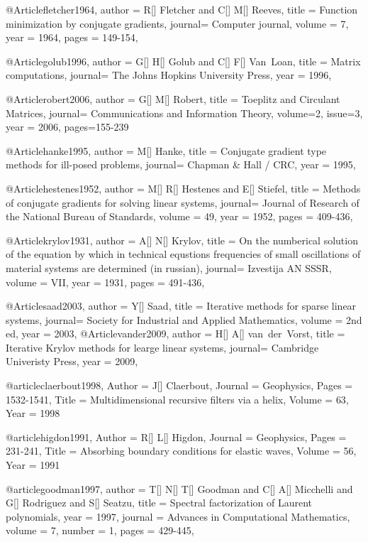{@Article{fletcher1964,
  author = 	 {R[] Fletcher and C[] M[] Reeves},
  title  = 	 {Function minimization by conjugate gradients},
  journal= 	 {Computer journal},
  volume =	 {7},
  year   = 	 1964,
  pages = 149-154,
}

@Article{golub1996,
  author = 	 {G[] H[] Golub and C[] F[] Van~Loan},
  title  = 	 {Matrix computations},
  journal= 	 {The Johns Hopkins University Press},
  year   = 	 1996,
}

@Article{robert2006,
  author = 	 {G[] M[] Robert},
  title  = 	 {Toeplitz and Circulant Matrices},
  journal= 	 {Communications and Information Theory},
  volume=2,
  issue=3,
  year   = 	 2006,
  pages={155-239}
}

@Article{hanke1995,
  author = 	 {M[] Hanke},
  title  = 	 {Conjugate gradient type methods for ill-posed problems},
  journal= 	 {Chapman \& Hall / CRC},
  year   = 	 1995,
}

@Article{hestenes1952,
  author = 	 {M[] R[] Hestenes and E[] Stiefel},
  title  = 	 {Methods of conjugate gradients for solving linear systems},
  journal= 	 {Journal of Research of the National Bureau of Standards},
  volume =	 {49},
  year   = 	 1952,
  pages = 	 409-436,
}

@Article{krylov1931,
  author = 	 {A[] N[] Krylov},
  title  = 	 {On the numberical solution of the equation by which in technical equstions frequencies of small oscillations of material systems are determined (in russian)},
  journal= 	 {Izvestija AN SSSR},
  volume =	 {VII},
  year   = 	 1931,
  pages = 491-436,
}

@Article{saad2003,
  author = 	 {Y[] Saad},
  title  = 	 {Iterative methods for sparse linear systems},
  journal= 	 {Society for Industrial and Applied Mathematics},
  volume =	 {2nd ed},
  year   = 	 2003,
}
@Article{vander2009,
  author = 	 {H[] A[] van~der~Vorst},
  title  = 	 {Iterative Krylov methods for learge linear systems},
  journal= 	 {Cambridge Univeristy Press},
  year   = 	 2009,
}


@article{claerbout1998,
	Author = {J[] Claerbout},
	Journal = {Geophysics},
	Pages = {1532-1541},
	Title = {Multidimensional recursive filters via a helix},
	Volume = {63},
	Year = {1998}}

@article{higdon1991,
	Author = {R[] L[] Higdon},
	Journal = {Geophysics},
	Pages = {231-241},
	Title = {Absorbing boundary conditions for elastic waves},
	Volume = {56},
	Year = {1991}}
	



@article{goodman1997,
  author =	 {T[] N[] T[] Goodman and C[] A[] Micchelli and G[] Rodriguez and S[] Seatzu},
  title =	 {Spectral factorization of Laurent polynomials},
  year =	 1997,
  journal =	 {Advances in Computational Mathematics},
  volume =	 7,
  number =	 1,
  pages =	 {429-445},
}

}
